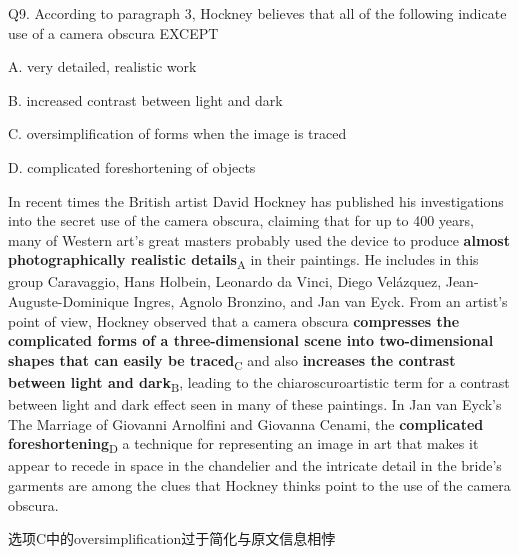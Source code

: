 \begin{blk}
    \begin{qst}
        Q9. According to paragraph 3, Hockney believes that all of the following indicate use of a camera obscura EXCEPT
    \end{qst}

    \begin{chc}
        A. very detailed, realistic work

        B. increased contrast between light and dark

        C. oversimplification of forms when the image is traced

        D. complicated foreshortening of objects
    \end{chc}

    \begin{psgq}
        In recent times the British artist David Hockney has published his investigations into the secret use of the camera obscura, claiming that for up to 400 years, many of Western art’s great masters probably used the device to produce \textbf{almost photographically realistic details}\textsubscript{A} in their paintings. He includes in this group Caravaggio, Hans Holbein, Leonardo da Vinci, Diego Velázquez, Jean-Auguste-Dominique Ingres, Agnolo Bronzino, and Jan van Eyck. From an artist’s point of view, Hockney observed that a camera obscura \textbf{compresses the complicated forms of a three-dimensional scene into two-dimensional shapes that can easily be traced}\textsubscript{C} and also \textbf{increases the contrast between light and dark}\textsubscript{B}, leading to the chiaroscuroartistic term for a contrast between light and dark effect seen in many of these paintings. In Jan van Eyck’s The Marriage of Giovanni Arnolfini and Giovanna Cenami, the \textbf{complicated foreshortening}\textsubscript{D} a technique for representing an image in art that makes it appear to recede in space in the chandelier and the intricate detail in the bride’s garments are among the clues that Hockney thinks point to the use of the camera obscura.
    \end{psgq}

    \begin{nlz}
        选项C中的oversimplification过于简化与原文信息相悖
    \end{nlz}
\end{blk}

\newpage